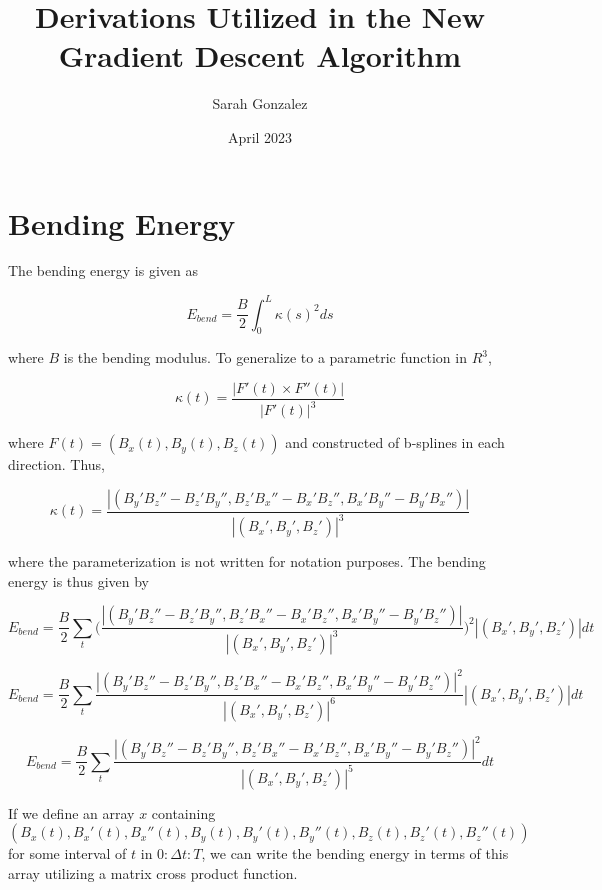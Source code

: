 \documentclass{article}
\title{Derivations Utilized in the New Gradient Descent Algorithm}
\author{Sarah Gonzalez}
\date{April 2023}
\begin{document}
\maketitle

\section{Bending Energy}

The bending energy is given as

\begin{equation}
    E_{bend} = \frac{B}{2} \int_0^L \kappa(s)^2 ds
\end{equation}

\noindent
where $B$ is the bending modulus. To generalize to a parametric function in $R^3$,

\begin{equation}
   \kappa(t) = \frac{|F'(t) \times F''(t)|}{|F'(t)|^3}
\end{equation}

\noindent
where $F(t) = (B_x(t), B_y(t), B_z(t))$ and constructed of b-splines in each direction. Thus,

\begin{equation}
    \kappa(t) = \frac{|(B_y'B_z''-B_z'B_y'' ,  B_z'B_x''-B_x'B_z'' ,  B_x'B_y''-B_y'B_x'' )|}{|(B_x', B_y', B_z')|^3}
    \label{kappaoft}
\end{equation}

\noindent
where the parameterization is not written for notation purposes. The bending energy is thus given by

\begin{equation}
    E_{bend} = \frac{B}{2} \sum_t \bigg( \frac{|(B_y'B_z''-B_z'B_y'' ,  B_z'B_x''-B_x'B_z'' ,  B_x'B_y''-B_y'B_z'' )|}{|(B_x', B_y', B_z')|^3} \bigg)^2 |(B_x', B_y', B_z')| dt
\end{equation}

\begin{equation}
    E_{bend} = \frac{B}{2} \sum_t \frac{|(B_y'B_z''-B_z'B_y'' ,  B_z'B_x''-B_x'B_z'' ,  B_x'B_y''-B_y'B_z'' )|^2}{|(B_x', B_y', B_z')|^6} |(B_x', B_y', B_z')| dt
\end{equation}

\begin{equation}
    E_{bend} = \frac{B}{2} \sum_t \frac{|(B_y'B_z''-B_z'B_y'' ,  B_z'B_x''-B_x'B_z'' ,  B_x'B_y''-B_y'B_z'' )|^2}{|(B_x', B_y', B_z')|^5} dt
\end{equation}

If we define an array $x$ containing $(B_x(t), B_x'(t),B_x''(t),B_y(t), B_y'(t),B_y''(t),B_z(t), B_z'(t),B_z''(t))$ for some interval of $t$ in $0:\Delta t:T$, we can write the bending energy in terms of this array utilizing a matrix cross product function.
\end{document}
